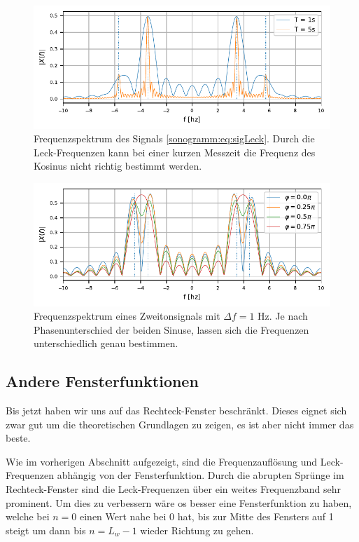 \begin{figure}
    \centering
    \includegraphics{papers/sonogramm/images/twohamrrect.pdf}
    \caption{Frequenzspektrum des Signals \eqref{sonogramm:eq:sigLeck}.
    Durch die Leck-Frequenzen kann bei einer kurzen Messzeit die Frequenz des Kosinus 
    nicht richtig bestimmt werden.
    \label{sonogramm:leakageDemo2}
    }
\end{figure}

\begin{figure}
    \centering
    \includegraphics{papers/sonogramm/images/twoharmphasediff.pdf}
    \caption{Frequenzspektrum eines Zweitonsignals mit $\Delta f = 1$ Hz.
    Je nach Phasenunterschied der beiden Sinuse, lassen sich die Frequenzen unterschiedlich
    genau bestimmen.
    \label{sonogramm:freqdiffdemo}
    }
\end{figure}

\subsection{Andere Fensterfunktionen}
Bis jetzt haben wir uns auf das Rechteck-Fenster beschränkt.
Dieses eignet sich zwar gut um die theoretischen Grundlagen zu zeigen,
es ist aber nicht immer das beste.

Wie im vorherigen Abschnitt aufgezeigt, sind die Frequenzauflösung und 
Leck-Frequenzen abhängig von der Fensterfunktion.
Durch die abrupten Sprünge im Rechteck-Fenster sind die Leck-Frequenzen 
über ein weites Frequenzband sehr prominent.
Um dies zu verbessern wäre os besser eine Fensterfunktion zu haben,
welche bei $n = 0$ einen Wert nahe bei 0 hat,
bis zur Mitte des Fensters auf 1 steigt um dann bis $n = L_w -1$ wieder Richtung zu gehen. 

